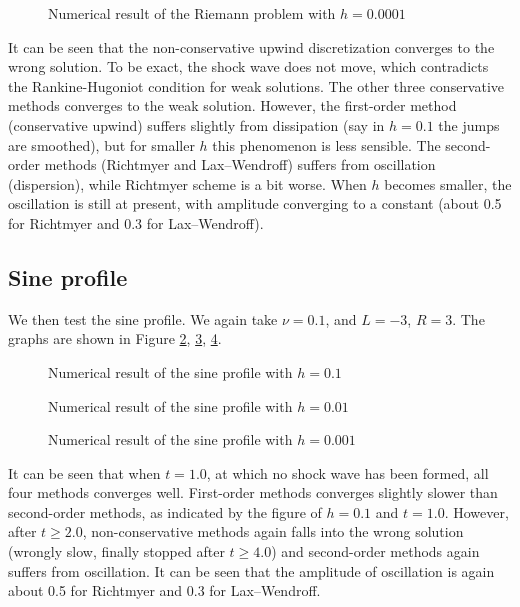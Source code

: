 \documentclass[english, nochinese]{pnote}
\begin{document}
\begin{figure}[htbp]
\centering
\scalebox{0.7}{}
\caption{Numerical result of the Riemann problem with $ h = 0.0001 $}
\label{Fig:Rie4}
\end{figure}

It can be seen that the non-conservative upwind discretization converges to the wrong solution. To be exact, the shock wave does not move, which contradicts the Rankine-Hugoniot condition for weak solutions. The other three conservative methods converges to the weak solution. However, the first-order method (conservative upwind) suffers slightly from dissipation (say in $ h = 0.1 $ the jumps are smoothed), but for smaller $h$ this phenomenon is less sensible. The second-order methods (Richtmyer and Lax--Wendroff) suffers from oscillation (dispersion), while Richtmyer scheme is a bit worse. When $h$ becomes smaller, the oscillation is still at present, with amplitude converging to a constant (about 0.5 for Richtmyer and 0.3 for Lax--Wendroff).

\subsection{Sine profile}

We then test the sine profile. We again take $ \nu = 0.1 $, and $ L = -3 $, $ R = 3 $. The graphs are shown in Figure \ref{Fig:Sine1}, \ref{Fig:Sine2}, \ref{Fig:Sine3}.

\begin{figure}[htbp]
\centering
\scalebox{0.7}{}
\caption{Numerical result of the sine profile with $ h = 0.1 $}
\label{Fig:Sine1}
\end{figure}

\begin{figure}[htbp]
\centering
\scalebox{0.7}{}
\caption{Numerical result of the sine profile with $ h = 0.01 $}
\label{Fig:Sine2}
\end{figure}

\begin{figure}[htbp]
\centering
\scalebox{0.7}{}
\caption{Numerical result of the sine profile with $ h = 0.001 $}
\label{Fig:Sine3}
\end{figure}

It can be seen that when $ t = 1.0 $, at which no shock wave has been formed, all four methods converges well. First-order methods converges slightly slower than second-order methods, as indicated by the figure of $ h = 0.1 $ and $ t = 1.0 $. However, after $ t \ge 2.0 $, non-conservative methods again falls into the wrong solution (wrongly slow, finally stopped after $ t \ge 4.0 $) and second-order methods again suffers from oscillation. It can be seen that the amplitude of oscillation is again about 0.5 for Richtmyer and 0.3 for Lax--Wendroff.
\end{document}
